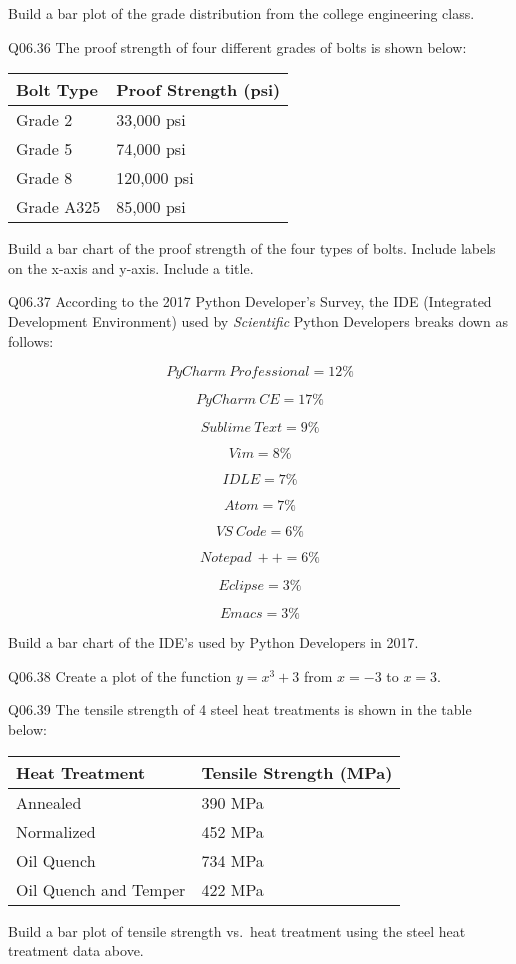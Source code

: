 \documentclass{book}
\newenvironment{problems}{}{}  %
\begin{document}
\begin{problems}
Build a bar plot of the grade distribution from the college engineering
class.

Q06.36 The proof strength of four different grades of bolts is shown
below:

\begin{longtable}[]{@{}ll@{}}
\toprule
Bolt Type & Proof Strength (psi)\tabularnewline
\midrule
\endhead
Grade 2 & 33,000 psi\tabularnewline
Grade 5 & 74,000 psi\tabularnewline
Grade 8 & 120,000 psi\tabularnewline
Grade A325 & 85,000 psi\tabularnewline
\bottomrule
\end{longtable}

Build a bar chart of the proof strength of the four types of bolts.
Include labels on the x-axis and y-axis. Include a title.

Q06.37 According to the 2017 Python Developer's Survey, the IDE
(Integrated Development Environment) used by \emph{Scientific} Python
Developers breaks down as follows:

\[ PyCharm \ Professional = 12\% \]

\[ PyCharm \ CE = 17\% \]

\[ Sublime \ Text = 9\% \]

\[ Vim = 8\% \]

\[ IDLE = 7\% \]

\[ Atom = 7\% \]

\[ VS \ Code = 6\% \]

\[ Notepad \ ++ = 6\% \]

\[ Eclipse = 3\% \]

\[ Emacs = 3\% \]

Build a bar chart of the IDE's used by Python Developers in 2017.

Q06.38 Create a plot of the function \(y=x^3+3\) from \(x=-3\) to
\(x=3\).

Q06.39 The tensile strength of 4 steel heat treatments is shown in the
table below:

\begin{longtable}[]{@{}ll@{}}
\toprule
Heat Treatment & Tensile Strength (MPa)\tabularnewline
\midrule
\endhead
Annealed & 390 MPa\tabularnewline
Normalized & 452 MPa\tabularnewline
Oil Quench & 734 MPa\tabularnewline
Oil Quench and Temper & 422 MPa\tabularnewline
\bottomrule
\end{longtable}

Build a bar plot of tensile strength vs.~heat treatment using the steel
heat treatment data above.
        \end{problems}
\end{document}

